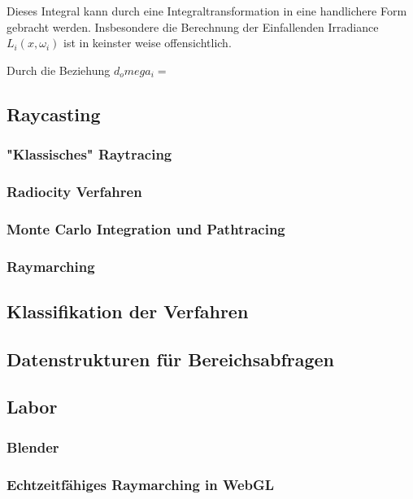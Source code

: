 Dieses Integral kann durch eine Integraltransformation in eine handlichere Form gebracht werden. Insbesondere die Berechnung der Einfallenden Irradiance  $L_i(x, \omega_i)$  ist in keinster weise offensichtlich. 



Durch die Beziehung $d_omega_i = $

\subsection{Raycasting}
\subsubsection{"Klassisches" Raytracing}
\subsubsection{Radiocity Verfahren}
\subsubsection{Monte Carlo Integration und Pathtracing}
\subsubsection{Raymarching}
\subsection{Klassifikation der Verfahren}

\subsection{Datenstrukturen für Bereichsabfragen}


\subsection{Labor}
\subsubsection{Blender}
\subsubsection{Echtzeitfähiges Raymarching in WebGL}
